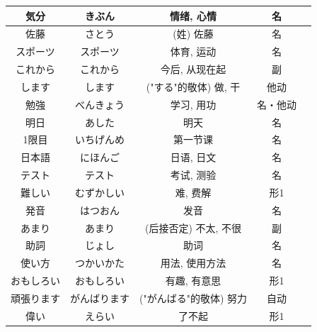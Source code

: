\begin{longtable}{|c|c|c|c|c|}
気分 & きぶん & 情绪, 心情 & 名 & \\ \hline
佐藤 & さとう & (姓) 佐藤 & 名 & \\ \hline
スポーツ & スポーツ & 体育, 运动 & 名 & \\ \hline
これから & これから & 今后, 从现在起 & 副 & \\ \hline
します & します & ("する"的敬体) 做, 干 & 他动 & \\ \hline
勉強 & べんきょう & 学习, 用功 & 名・他动 & \\ \hline
明日 & あした & 明天 & 名 & \\ \hline
1限目 & いちげんめ & 第一节课 & 名 & \\ \hline
日本語 & にほんご & 日语, 日文 & 名 & \\ \hline
テスト & テスト & 考试, 测验 & 名 & \\ \hline
難しい & むずかしい & 难, 费解 & 形1 & \\ \hline
発音 & はつおん & 发音 & 名 & \\ \hline
あまり & あまり & (后接否定) 不太, 不很 & 副 & \\ \hline
助詞 & じょし & 助词 & 名 & \\ \hline
使い方 & つかいかた & 用法, 使用方法 & 名 & \\ \hline
おもしろい & おもしろい & 有趣, 有意思 & 形1 & \\ \hline
頑張ります & がんばります & ("がんばる"的敬体) 努力 & 自动 & \\ \hline
偉い & えらい & 了不起 & 形1 & \\ \hline
\end{longtable}
